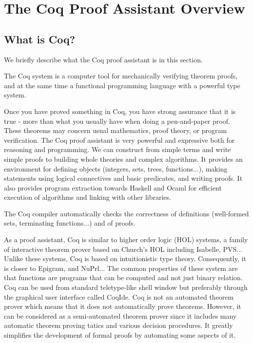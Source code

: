 \section{The Coq Proof Assistant Overview}
\subsection{What is Coq?}
We briefly describe what the Coq proof assistant is in this section.

The Coq system is a computer tool for mechanically verifying theorem
proofs, and at the same time a functional programming language with a
powerful type system.

Once you have proved something in Coq, you
have strong assurance that it is true - more than what you usually
have when doing a pen-and-paper proof. These theorems may concern
usual mathematics, proof theory, or program verification. The Coq
proof assistant is very powerful and expressive both for reasoning
and programming. We can construct from simple terms and write simple
proofs to building whole theories and complex algorithms. It provides
an environment for defining objects (integers, sets, trees,
functions...), making statements using logical connectives and basic
predicates, and writing proofs. It also provides program extraction
towards Haskell and Ocaml for efficient execution of algorithms and
linking with other libraries.

The Coq compiler automatically checks the correctness of definitions
(well-formed sets, terminating functions...) and of proofs.

As a proof assistant, Coq is similar to higher order logic (HOL)
systems, a family of interactive theorem prover based on Church's HOL
including Isabelle, PVS... Unlike these systems, Coq is based on
intuitionistic type theory. Consequently, it is closer to Epigram, and
NuPrl... The common properties of these system are that functions are
programs that can be computed and not just binary relation.  Coq can
be used from standard teletype-like shell window but preferably
through the graphical user interface called CoqIde. Coq is not an
automated theorem prover which means that it does not automatically
prove theorems. However, it can be considered as a semi-automated
theorem prover since it includes many automatic theorem proving tatics
and various decision procedures. It greatly simplifies the development
of formal proofs by automating some aspects of it.

